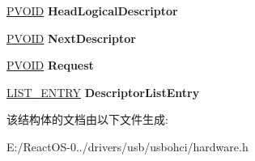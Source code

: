 \begin{DoxyCompactItemize}
\hyperlink{interfacevoid}{P\+V\+O\+ID} {\bfseries Head\+Logical\+Descriptor}
\item 
\mbox{\label{struct___o_h_c_i___e_n_d_p_o_i_n_t___d_e_s_c_r_i_p_t_o_r_a49b93ab3bc26f71142434bcbf87026af}} 
\hyperlink{interfacevoid}{P\+V\+O\+ID} {\bfseries Next\+Descriptor}
\item 
\mbox{\label{struct___o_h_c_i___e_n_d_p_o_i_n_t___d_e_s_c_r_i_p_t_o_r_a09d39d0327679b72353f796c6bb7c590}} 
\hyperlink{interfacevoid}{P\+V\+O\+ID} {\bfseries Request}
\item 
\mbox{\label{struct___o_h_c_i___e_n_d_p_o_i_n_t___d_e_s_c_r_i_p_t_o_r_ac86b4621cadbf2ebe182a31c077d30f9}} 
\hyperlink{struct___l_i_s_t___e_n_t_r_y}{L\+I\+S\+T\+\_\+\+E\+N\+T\+RY} {\bfseries Descriptor\+List\+Entry}
\end{DoxyCompactItemize}


该结构体的文档由以下文件生成\+:\begin{DoxyCompactItemize}
\item 
E\+:/\+React\+O\+S-\/0../drivers/usb/usbohci/hardware.\+h\end{DoxyCompactItemize}
